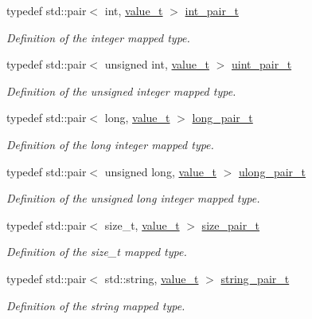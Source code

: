 \begin{DoxyCompactItemize}
typedef std::pair$<$ int, \hyperlink{class_t}{value\_\-t} $>$ \hyperlink{struct_d_d4hep_1_1_primitive_a216f9ee1122ffc970b0d419abe76009c}{int\_\-pair\_\-t}
\begin{DoxyCompactList}\small\item\em Definition of the integer mapped type. \item\end{DoxyCompactList}\item 
typedef std::pair$<$ unsigned int, \hyperlink{class_t}{value\_\-t} $>$ \hyperlink{struct_d_d4hep_1_1_primitive_a1f46f9637b5b90c407a5725db6d09142}{uint\_\-pair\_\-t}
\begin{DoxyCompactList}\small\item\em Definition of the unsigned integer mapped type. \item\end{DoxyCompactList}\item 
typedef std::pair$<$ long, \hyperlink{class_t}{value\_\-t} $>$ \hyperlink{struct_d_d4hep_1_1_primitive_a9430e72efcdbc036b1878b578f75c696}{long\_\-pair\_\-t}
\begin{DoxyCompactList}\small\item\em Definition of the long integer mapped type. \item\end{DoxyCompactList}\item 
typedef std::pair$<$ unsigned long, \hyperlink{class_t}{value\_\-t} $>$ \hyperlink{struct_d_d4hep_1_1_primitive_a776a90beccb1b044c258b851c8128509}{ulong\_\-pair\_\-t}
\begin{DoxyCompactList}\small\item\em Definition of the unsigned long integer mapped type. \item\end{DoxyCompactList}\item 
typedef std::pair$<$ size\_\-t, \hyperlink{class_t}{value\_\-t} $>$ \hyperlink{struct_d_d4hep_1_1_primitive_a330a7f3f969e59b48e16c6054668f7d3}{size\_\-pair\_\-t}
\begin{DoxyCompactList}\small\item\em Definition of the size\_\-t mapped type. \item\end{DoxyCompactList}\item 
typedef std::pair$<$ std::string, \hyperlink{class_t}{value\_\-t} $>$ \hyperlink{struct_d_d4hep_1_1_primitive_ab799730f156ae3e2ba15f621289c0e99}{string\_\-pair\_\-t}
\begin{DoxyCompactList}\small\item\em Definition of the string mapped type. \item\end{DoxyCompactList}\item 

\end{DoxyCompactItemize}
